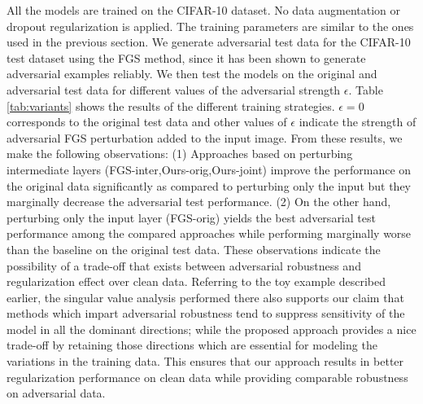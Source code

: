 \documentclass[letterpaper]{article} %
\begin{document}
All the models are trained on the CIFAR-10 dataset. No data augmentation or dropout regularization is applied. The training parameters are similar to the ones used in the previous section. We generate adversarial test data for the CIFAR-10 test dataset using the FGS method, since it has been shown to generate adversarial examples reliably. We then test the models on the original and adversarial test data for different values of the adversarial strength $\epsilon$. Table \ref{tab:variants} shows the results of the different training strategies. $\epsilon=0$ corresponds to the original test data and other values of $\epsilon$ indicate the strength of adversarial FGS perturbation added to the input image. From these results, we make the following observations: (1)  Approaches based on perturbing intermediate layers (FGS-inter,Ours-orig,Ours-joint) improve the performance on the original data significantly as compared to perturbing only the input but they marginally decrease the adversarial test performance. (2) On the other hand, perturbing only the input layer (FGS-orig) yields the best adversarial test performance among the compared approaches while performing marginally worse than the baseline on the original test data. These observations indicate the possibility of a trade-off that exists between adversarial robustness and regularization effect over clean data. Referring to the toy example described earlier, the singular value analysis performed there also supports our claim that methods which impart adversarial robustness tend to suppress sensitivity of the model in all the dominant directions; while the proposed approach provides a nice trade-off by retaining those directions which are essential for modeling the variations in the training data. This ensures that our approach results in better regularization performance on clean data while providing comparable robustness on adversarial data.
\end{document}
